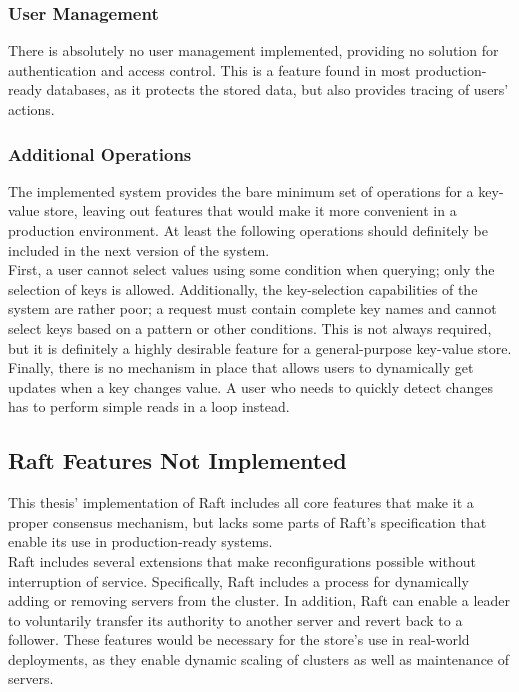 \subsubsection{User Management}

There is absolutely no user management implemented, providing no solution for authentication and access control. This is a feature found in most production-ready databases, as it protects the stored data, but also provides tracing of users' actions.

\subsubsection{Additional Operations}

The implemented system provides the bare minimum set of operations for a key-value store, leaving out features that would make it more convenient in a production environment. At least the following operations should definitely be included in the next version of the system.\\

First, a user cannot select values using some condition when querying; only the selection of keys is allowed. Additionally, the key-selection capabilities of the system are rather poor; a request must contain complete key names and cannot select keys based on a pattern or other conditions. This is not always required, but it is definitely a highly desirable feature for a general-purpose key-value store. Finally, there is no mechanism in place that allows users to dynamically get updates when a key changes value. A user who needs to quickly detect changes has to perform simple reads in a loop instead.

\subsection{Raft Features Not Implemented}

This thesis' implementation of Raft includes all core features that make it a proper consensus mechanism, but lacks some parts of Raft's specification that enable its use in production-ready systems.\\

Raft includes several extensions that make reconfigurations possible without interruption of service. Specifically, Raft includes a process for dynamically adding or removing servers from the cluster. In addition, Raft can enable a leader to voluntarily transfer its authority to another server and revert back to a follower. These features would be necessary for the store's use in real-world deployments, as they enable dynamic scaling of clusters as well as maintenance of servers.\\

